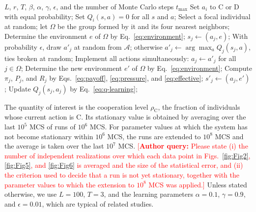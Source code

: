 \documentclass[%
  aip,cha,
  amsmath,amssymb,
  reprint,
  article-title,
]{revtex4-2}
\newcommand{\AQ}[1]{\textcolor{red}{[\textbf{Author query:} #1]}}
\begin{document}
\begin{algorithm}[H]
\caption{Spatial public goods game with environment-dependent peer pressure and Q-learning.}
\label{alg:PGG_Qlearning}
\begin{algorithmic}[1]
\REQUIRE $L$, $r$, $T$, $\beta$, $\alpha$, $\gamma$, $\epsilon$, and the number of Monte Carlo steps $t_{\max}$
    \STATE Set $a_i$ to $\mathrm{C}$ or $\mathrm{D}$ with equal probability;
    \STATE Set $Q_i(s,a)=0$ for all $s$ and $a$;
\ENDFOR
{}
        \STATE Select a focal individual at random; let $\Omega$ be the group formed by it and its four nearest neighbors;
        \STATE Determine the environment $e$ of $\Omega$ by Eq.~\eqref{eq:environment};
            \STATE $s_j\leftarrow(a_j,e)$;
            \STATE With probability $\epsilon$, draw $a'_j$ at random from $\mathcal{A}$; otherwise $a'_j\leftarrow\arg\max_{a}Q_j(s_j,a)$, ties broken at random;
        \ENDFOR
        \STATE Implement all actions simultaneously: $a_j\leftarrow a'_j$ for all $j\in\Omega$;
        \STATE Determine the new environment $e'$ of $\Omega$ by Eq.~\eqref{eq:environment};
            \STATE Compute $\pi_j$, $P_j$, and $R_j$ by Eqs.~\eqref{eq:payoff}, \eqref{eq:pressure}, and \eqref{eq:effective};
            \STATE $s'_j\leftarrow(a_j,e')$;
            \STATE Update $Q_j(s_j,a_j)$ by Eq.~\eqref{eq:q-learning};
        \ENDFOR
    \ENDFOR
\ENDFOR
\end{algorithmic}
\end{algorithm}

The quantity of interest is the cooperation level $\rho_{\mathrm{C}}$, the fraction of individuals whose current action is $\mathrm{C}$. Its stationary value is obtained by averaging over the last $10^5$ MCS of runs of $10^6$ MCS. For parameter values at which the system has not become stationary within $10^6$ MCS, the runs are extended to $10^8$ MCS and the average is taken over the last $10^7$ MCS. \AQ{Please state (i) the number of independent realizations over which each data point in Figs.~\ref{fig:Fig2}, \ref{fig:Fig5}, and \ref{fig:Fig6} is averaged and the size of the statistical error, and (ii) the criterion used to decide that a run is not yet stationary, together with the parameter values to which the extension to $10^8$ MCS was applied.} Unless stated otherwise, we use $L=100$, $T=3$, and the learning parameters $\alpha=0.1$, $\gamma=0.9$, and $\epsilon=0.01$, which are typical of related studies.\cite{zhao2024emergence,zheng2024evolution,li2025environmental}
\end{document}

